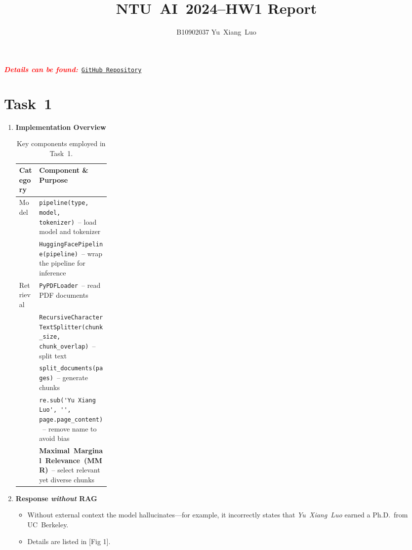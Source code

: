 \documentclass{article}
\title{NTU AI 2024–HW1 Report}
\author{B10902037 \quad Yu~Xiang~Luo}
\date{}
\begin{document}
\maketitle

\textbf{\textit{\textcolor{red}{Details can be found:}}}~\href{https://github.com/YuXiangLo/NTUAI2024}{\texttt{GitHub Repository}}

\section*{Task 1}

\begin{enumerate}[leftmargin=*]

\item \textbf{Implementation Overview}

\begin{table}[hbt]
  \centering
  \caption{Key components employed in Task 1.}
  \label{tab:components}
  \begin{tabularx}{0.93\linewidth}{@{}p{0.22\linewidth}X@{}}
    \toprule
    \textbf{Category} & \textbf{Component \& Purpose}\\
    \midrule
    Model &
      \texttt{pipeline(type, model, tokenizer)} – load model and tokenizer\\
      & \texttt{HuggingFacePipeline(pipeline)} – wrap the pipeline for inference\\[3pt]
    Retrieval &
      \texttt{PyPDFLoader} – read PDF documents\\
      & \texttt{RecursiveCharacterTextSplitter(chunk\_size, chunk\_overlap)} – split text\\
      & \texttt{split\_documents(pages)} – generate chunks\\
      & \verb|re.sub('Yu Xiang Luo', '', page.page_content)| – remove name to avoid bias\\
      & \textbf{Maximal Marginal Relevance (MMR)} – select relevant yet diverse chunks\footnotemark\\
    \bottomrule
  \end{tabularx}
\end{table}

\item \textbf{Response \emph{without} RAG}

\begin{itemize}[leftmargin=*]
	\item Without external context the model hallucinates—for example, it incorrectly states that \textit{Yu Xiang Luo} earned a Ph.D.~from UC Berkeley.
	\item Details are listed in [Fig 1].
\end{itemize}


\end{enumerate}
\end{document}
